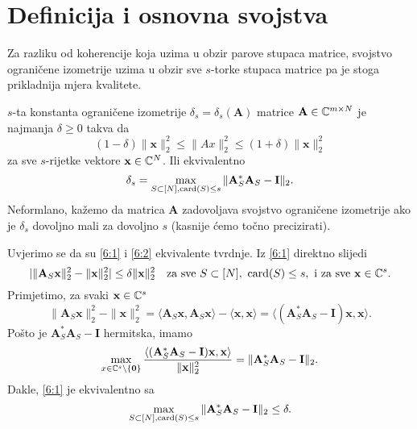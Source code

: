 \documentclass[a4paper,twoside,12pt]{memoir} %
\newcommand{\vect}[1]{\mathbf{#1}}
\renewcommand{\vec}{\vect}
\newcommand{\card}{\text{\normalfont{card}}}
\newcommand{\norm}[1]{\|{#1}\|}
\begin{document}
\section[Definicija i osnovna svojstva][Definicija i osnovna svojstva]{Definicija i osnovna svojstva}
Za razliku od koherencije koja uzima u obzir parove stupaca matrice, svojstvo ograni\v{c}ene izometrije uzima u obzir sve $s$-torke stupaca matrice pa je stoga prikladnija mjera kvalitete.
\begin{defn}\label{defn:6:1}
    $s$-ta konstanta ograni\v{c}ene izometrije $\delta_s = \delta_s(\vec A)$ matrice $\vec A \in \C^{m \times N}$ je najmanja $\delta \geq 0$ takva da
    \begin{equation}\label{6:1}
        (1-\delta) \norm{\vec x}_2^2 \leq \norm{Ax}_2^2 \leq (1+\delta)\norm{\vec x}_2^2 
    \end{equation}
    za sve $s$-rijetke vektore $\vec x \in \C^N$. Ili ekvivalentno
    \begin{equation}\label{6:2}
        \delta_s = \max_{S \subset [N], \card(S) \leq s} \norm{\vec A^*_S \vec A_S - \vec I}_2.
    \end{equation}
    Neformlano, ka\v{z}emo da matrica $\vec A$ zadovoljava svojstvo ograni\v{c}ene izometrije ako je $\delta_s$ dovoljno mali za dovoljno $s$ (kasnije \'cemo to\v{c}no precizirati).
\end{defn}
Uvjerimo se da su \eqref{6:1} i \eqref{6:2} ekvivalente tvrdnje. Iz \eqref{6:1} direktno slijedi
\begin{equation*}
    | \norm{\vec A_S \vec x}_2^2 - \norm{\vec x}_2^2| \leq \delta \norm{\vec x}_2^2 \quad \text{za sve } S \subset [N],\ \card(S) \leq s,\ \text{i za sve } \vec x \in \C^s.
\end{equation*}
Primjetimo, za svaki $\vec x \in \C^s$
\begin{equation*}
    \norm{\vec A_S \vec x}_2^2 - \norm{\vec x}_2^2 = \langle \vec A_S \vec x, \vec A_S \vec x \rangle - \langle \vec x, \vec x \rangle = \langle (\vec A_S^* \vec A_S - \vec I )\vec x, \vec x\rangle.
\end{equation*}
Po\v{s}to je $\vec A_S^* \vec A_S - \vec I$ hermitska, imamo
\begin{equation*}
    \max_{x \in \C^s \backslash \{\vec 0\}} \frac{\langle (\vec A_S^* \vec A_S - \vec I)\vec x, \vec x \rangle}{\norm{\vec x}_2^2} = \norm{\vec A_S^* \vec A_S - \vec I}_2.
\end{equation*}
Dakle, \eqref{6:1} je ekvivalentno sa
\begin{equation*}
    \max_{S \subset [N], \card(S) \leq s} \norm{\vec A^*_S \vec A_S - \vec I}_2 \leq \delta. 
\end{equation*}
\end{document}
